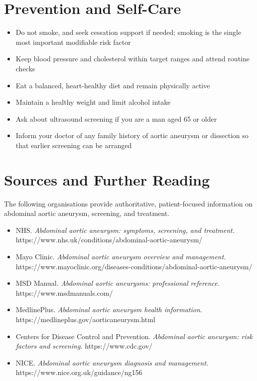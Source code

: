 \section*{Prevention and Self-Care}
\begin{itemize}
    \item Do not smoke, and seek cessation support if needed; smoking is the single most important modifiable risk factor
    \item Keep blood pressure and cholesterol within target ranges and attend routine checks
    \item Eat a balanced, heart-healthy diet and remain physically active
    \item Maintain a healthy weight and limit alcohol intake
    \item Ask about ultrasound screening if you are a man aged 65 or older
    \item Inform your doctor of any family history of aortic aneurysm or dissection so that earlier screening can be arranged
\end{itemize}

\section*{Sources and Further Reading}
The following organisations provide authoritative, patient-focused information on abdominal aortic aneurysm, screening, and treatment.

\begin{itemize}
    \item NHS. \textit{Abdominal aortic aneurysm: symptoms, screening, and treatment.} https://www.nhs.uk/conditions/abdominal-aortic-aneurysm/
    \item Mayo Clinic. \textit{Abdominal aortic aneurysm overview and management.} https://www.mayoclinic.org/diseases-conditions/abdominal-aortic-aneurysm/
    \item MSD Manual. \textit{Abdominal aortic aneurysms: professional reference.} https://www.msdmanuals.com/
    \item MedlinePlus. \textit{Abdominal aortic aneurysm health information.} https://medlineplus.gov/aorticaneurysm.html
    \item Centers for Disease Control and Prevention. \textit{Abdominal aortic aneurysm: risk factors and screening.} https://www.cdc.gov/
    \item NICE. \textit{Abdominal aortic aneurysm diagnosis and management.} https://www.nice.org.uk/guidance/ng156
\end{itemize}
